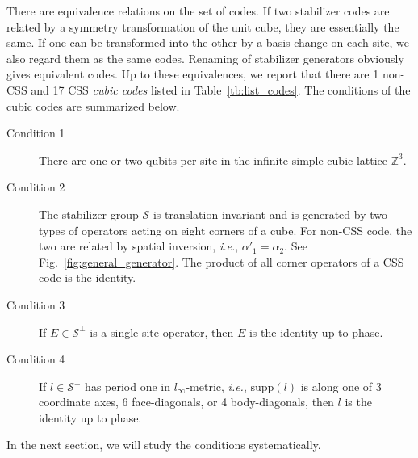 \documentclass[letterpaper,10pt,pra,aps,showpacs,twocolumn]{revtex4-1}
\theoremstyle{definition} \newtheorem{defn}{Definition}
\theoremstyle{definition} \newtheorem{remark}{Remark}
\newcommand{\supp}{\mathrm{supp}}
\newcommand{\ie}{\emph{i.e.}}
\begin{document}
There are equivalence relations on the set of codes. If two stabilizer codes are related by a symmetry transformation of the unit cube, they are essentially the same. If one can be transformed into the other by a basis change on each site, we also regard them as the same codes. Renaming of stabilizer generators obviously gives equivalent codes. Up to these equivalences, we report that there are 1 non-CSS and 17 CSS \emph{cubic codes} listed in Table~\ref{tb:list_codes}. The conditions of the cubic codes are summarized below.
\begin{description}
 \item[Condition 1] There are one or two qubits per site in the infinite simple cubic lattice $\mathbb{Z}^3$.
 \item[Condition 2] The stabilizer group $\mathcal{S}$ is translation-invariant and is generated by two types of operators acting on eight corners of a cube. For non-CSS code, the two are related by spatial inversion, \ie, $\alpha'_1 = \alpha_2$. See Fig.~\ref{fig:general_generator}. The product of all corner operators of a CSS code is the identity.
 \item[Condition 3] If $ E \in \mathcal{S}^\perp $ is a single site operator, then $E$ is the identity up to phase.
 \item[Condition 4] If $ l \in \mathcal{S}^\perp $ has period one in $l_\infty$-metric, \ie, $\supp(l)$ is along one of 3 coordinate axes, 6 face-diagonals, or 4 body-diagonals, then $l$ is the identity up to phase.
\end{description}
In the next section, we will study the conditions systematically.
\end{document}
